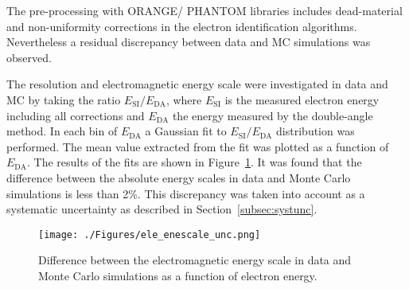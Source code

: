 The pre-processing with ORANGE/ PHANTOM libraries includes dead-material and non-uniformity corrections in the electron identification algorithms. Nevertheless a residual discrepancy between data and MC simulations was observed. 

The resolution and electromagnetic energy scale were investigated in data and MC by taking the ratio $E_\text{SI}/E_\text{DA}$, where $E_\text{SI}$ is the measured electron energy including all corrections and $E_\text{DA}$ the energy measured by the double-angle method. In each bin of $E_\text{DA}$ a Gaussian fit to $E_\text{SI}/E_\text{DA}$ distribution was performed. The mean value extracted from the fit was plotted as a function of $E_\text{DA}$. The results of the fits are shown in Figure~\ref{fig:ele_enescale_unc}. It was found that the difference between the absolute energy scales in data and Monte Carlo simulations is less than 2\%. This discrepancy was taken into account as a systematic uncertainty as described in Section~\ref{subsec:systunc}.
\begin{figure}
	\centering
		\texttt{[image: ./Figures/ele\_enescale\_unc.png]}
	\caption{Difference between the electromagnetic energy scale in data and Monte Carlo simulations as a function of electron energy.}
	\label{fig:ele_enescale_unc}
\end{figure}
